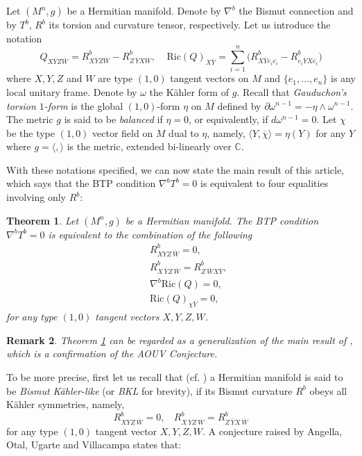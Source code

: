 \documentclass{amsart}
\numberwithin{equation}{section}
\newtheorem{theorem} {Theorem} [section]
\newtheorem{remark}  [theorem]     {Remark}
\theoremstyle{definition}
\renewcommand{\1}{\mathds{1}}
\renewcommand{\>}{\rightarrow}
\begin{document}
Let $(M^n,g)$ be a Hermitian manifold. Denote by $\nabla^b$ the Bismut connection and by $T^b$, $R^b$ its torsion and curvature tensor, respectively. Let us introduce the notation
\begin{equation*}
Q_{X\overline{Y}Z\overline{W}} = R^b_{X\overline{Y}Z\overline{W}} - R^b_{Z\,\overline{Y}X\overline{W}}, \ \ \ \ \ \mathrm{Ric}(Q)_{X\overline{Y}} = \sum_{i=1}^n \big( R^b_{X\overline{Y}e_i\overline{e_i}} - R^b_{e_i\overline{Y}X\overline{e_i}} \big)
\end{equation*}
where $X,Y,Z$ and $W$ are type $(1,0)$ tangent vectors on $M$ and $\{ e_1, \ldots , e_n\}$ is any local unitary frame. Denote by $\omega$ the K\"ahler form of $g$.
Recall that {\em Gauduchon's torsion $1$-form} is the global $(1,0)$-form $\eta$ on $M$ defined by $\partial \omega^{n-1} = - \eta \wedge \omega^{n-1}$.
The metric $g$ is said to be {\em balanced} if $\eta =0$, or equivalently, if $d \omega^{n-1} = 0$.
Let $\chi$ be the type $(1,0)$ vector field on $M$ dual to $\eta$, namely, $\langle Y, \overline{\chi}\rangle = \eta (Y)$ for any $Y$ where $g = \langle , \rangle $ is the metric, extended bi-linearly over ${\mathbb C}$.

With these notations specified, we can now state the main result of this article, which says that the BTP condition $\nabla^b T^b=0$ is equivalent to four equalities involving only $R^b$:

\begin{theorem} \label{theorem1.1}
Let $(M^n,g)$ be a Hermitian manifold. The BTP condition $\nabla^bT^b=0$ is equivalent to the combination of the following
\begin{eqnarray}
&& R^b_{XYZ\,\overline{W}}=0 ,\label{eq:1.1} \\
&& R^b_{X\,\overline{Y}Z\,\overline{W}}=R^b_{Z\,\overline{W}X\overline{Y}} ,\label{eq:1.2} \\
&& \nabla^b \mathrm{Ric}(Q)=0, \label{eq:1.3}\\
&& \mathrm{Ric}(Q)_{\chi \overline{Y}} =0,  \label{eq:1.4}
\end{eqnarray}
for any type $(1,0)$ tangent vectors $X,Y,Z,W$.
\end{theorem}

\begin{remark} \label{remark1.2}
Theorem \ref{theorem1.1} can be regarded as a generalization of the main result of  \cite{ZhaoZ19Str}, which is a confirmation of the AOUV Conjecture.
\end{remark}

To be more precise, first let us recall that (cf. \cite{AOUV,FT,FTV,YZZ,ZhaoZ19Str,ZhaoZ23}) a Hermitian manifold is said to be {\em  Bismut K\"ahler-like} (or {\em BKL} for brevity), if its Bismut curvature $R^b$ obeys all K\"ahler symmetries, namely,
\begin{equation*}
 R^b_{XYZ\,\overline{W}}=0, \ \ \ \  R^b_{X\,\overline{Y}Z\,\overline{W}}=R^b_{Z\,\overline{Y}X\,\overline{W}}
\end{equation*}
for any type $(1,0)$ tangent vector $X,Y,Z,W$. A conjecture raised by Angella, Otal, Ugarte and Villacampa states  that:
\end{document}
